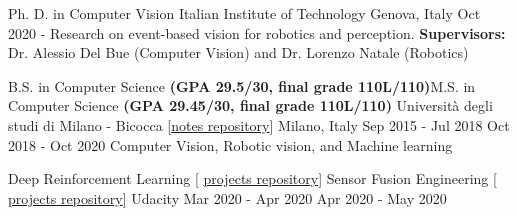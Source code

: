 

\begin{cventries}

  \cventry
{Ph. D.  in Computer Vision} %
{Italian Institute of Technology} %
{Genova, Italy} %
{Oct 2020 -} %
{Research on event-based vision for robotics and perception. \linebreak \textbf{Supervisors:} Dr. Alessio Del Bue (Computer Vision) and Dr. Lorenzo Natale (Robotics)}

  \vspace{0.3cm}

  \cventry
  {B.S. in Computer Science \textbf{(GPA 29.5/30, final grade 110L/110)}\linebreak M.S. in Computer Science \textbf{(GPA 29.45/30, final grade 110L/110)}  } %
  {Università degli studi di Milano - Bicocca  {\tiny [\href{https://github.com/gianscarpe/unimib}{notes repository}]} } %
  {Milano, Italy} %
  {Sep 2015 - Jul 2018 \linebreak Oct 2018 - Oct 2020} %
  {Computer Vision, Robotic vision, and Machine learning
  }

  \cventry
  {Deep Reinforcement Learning {\tiny [ \href{https://github.com/gianscarpe/udacity_deep_reinforcement_learning}{projects repository}]} 	
    \linebreak
    Sensor Fusion Engineering {\tiny [ \href{https://github.com/gianscarpe/udacity_sensor_fusion}{projects repository}]}
  } %
  {Udacity} %
  {} %
  {Mar 2020 - Apr 2020 \linebreak Apr 2020 - May 2020} %
  {
  }
  \vspace{-0.7cm}
\end{cventries}
